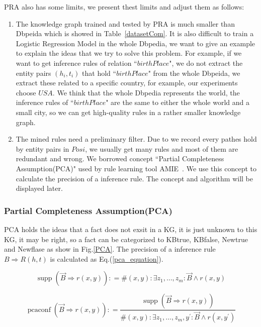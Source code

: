 \documentclass[runningheads]{llncs}
\begin{document}
PRA also has some limits, we present thest limits and adjust them as follows:
\begin{enumerate}
  \item The knowledge graph trained and tested by PRA is much smaller than Dbpeida which is showed in Table~\ref{datasetCom}. It is also difficult to train a Logistic Regression Model in the whole Dbpedia, we want to give an example to explain the ideas that we try to solve this problem. For example, if we want to get inference rules of relation ``$birthPlace$", we do not extract the entity pairs ${(h_i,t_i)}$ that hold ``$birthPlace$" from the whole Dbpeida, we extract these related to a specific country, for example, our experiments choose $USA$. We think that the whole Dbpedia represents the world, the inference rules of ``$birthPlace$" are the same to either the whole world and a small city, so we can get high-quality rules in a rather smaller knowledge graph.
  \item The mined rules need a preliminary filter. Due to we record every pathes hold by entity pairs in $Posi$, we usually get many rules and most of them are redundant and wrong. We borrowed concept ``Partial Completeness Assumption(PCA)" used by rule learning tool AMIE~\cite{galarraga2013amie}. We use this concept to calculate the precision of a inference rule. The concept and algorithm will be displayed later.
\end{enumerate}

\subsubsection{Partial Completeness Assumption(PCA)}
PCA holds the ideas that a fact does not exsit in a KG, it is just unknown to this KG, it may be right, so a fact can be categorized to KBtrue, KBfalse, Newtrue and Newflase as show in Fig.\ref{PCA}. The precision of a inference rule $B \Rightarrow R(h,t)$ is calculated as Eq.(\ref{pca_equation}).

\begin{equation}
  \operatorname { supp } ( \vec { B } \Rightarrow r ( x , y ) ) : = \# ( x , y ) : \exists z _ { 1 } , \ldots , z _ { m } : \vec { B } \wedge r ( x , y )
\end{equation}

\begin{equation} \label{pca_equation}
  \operatorname { pcaconf } ( \vec { B } \Rightarrow r ( x , y ) ) : = \frac { \operatorname { supp } ( \vec { B } \Rightarrow r ( x , y ) ) } { \# ( x , y ) : \exists z _ { 1 } , \ldots , z _ { m } , y ^ { \prime } : \vec { B } \wedge r \left( x , y ^ { \prime } \right) }
\end{equation}
\end{document}
